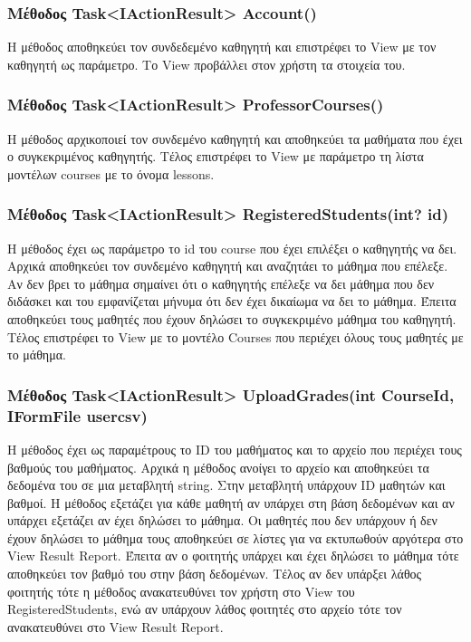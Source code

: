 \documentclass[12pt]{article}
\begin{document}
	\subsubsection{Μέθοδος Task<IActionResult> Account()}
	Η μέθοδος αποθηκεύει τον συνδεδεμένο καθηγητή και επιστρέφει το View με τον καθηγητή ως παράμετρο. Το View προβάλλει στον χρήστη τα στοιχεία του.
	
	\subsubsection{Μέθοδος Task<IActionResult> ProfessorCourses()}
	Η μέθοδος αρχικοποιεί τον συνδεμένο καθηγητή και αποθηκεύει τα μαθήματα που έχει ο συγκεκριμένος καθηγητής. Τέλος επιστρέφει το View με παράμετρο τη λίστα μοντέλων courses με το όνομα lessons.
	
	\subsubsection{Μέθοδος Task<IActionResult> RegisteredStudents(int? id)}
	Η μέθοδος έχει ως παράμετρο το id του course που έχει επιλέξει ο καθηγητής να δει. Αρχικά αποθηκεύει τον συνδεμένο καθηγητή και αναζητάει το μάθημα που επέλεξε. Αν δεν βρει το μάθημα σημαίνει ότι ο καθηγητής επέλεξε να δει μάθημα που δεν διδάσκει και του εμφανίζεται μήνυμα ότι δεν έχει δικαίωμα να δει το μάθημα. Έπειτα αποθηκεύει τους μαθητές που έχουν δηλώσει το συγκεκριμένο μάθημα του καθηγητή. Τέλος επιστρέφει το View με το  μοντέλο Courses που περιέχει όλους τους μαθητές με το μάθημα.
	
	\subsubsection{Μέθοδος Task<IActionResult> UploadGrades(int CourseId, IFormFile usercsv)}
	Η μέθοδος έχει ως παραμέτρους το ID του μαθήματος και το αρχείο που περιέχει τους βαθμούς του μαθήματος. Αρχικά η μέθοδος ανοίγει το αρχείο και αποθηκεύει  τα δεδομένα του σε μια μεταβλητή string. Στην μεταβλητή υπάρχουν ID μαθητών και βαθμοί. Η μέθοδος εξετάζει για κάθε μαθητή αν υπάρχει στη βάση δεδομένων και αν υπάρχει εξετάζει αν έχει δηλώσει το μάθημα. Οι μαθητές που δεν υπάρχουν ή δεν έχουν δηλώσει το μάθημα τους αποθηκεύει σε λίστες για να εκτυπωθούν αργότερα στο View Result Report. Έπειτα αν ο φοιτητής υπάρχει και έχει δηλώσει το μάθημα τότε αποθηκεύει τον βαθμό του στην βάση δεδομένων. Τέλος αν δεν υπάρξει λάθος φοιτητής τότε η μέθοδος ανακατευθύνει τον χρήστη στο View του RegisteredStudents, ενώ αν υπάρχουν λάθος φοιτητές στο αρχείο τότε τον ανακατευθύνει στο View Result Report.
	
\end{document}
